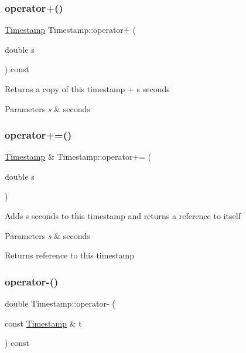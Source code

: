 \subsubsection{\texorpdfstring{operator+()}{operator+()}}
{\footnotesize\ttfamily \hyperlink{classDUtils_1_1Timestamp}{Timestamp} Timestamp\+::operator+ (\begin{DoxyParamCaption}\item[{double}]{s }\end{DoxyParamCaption}) const}

Returns a copy of this timestamp + s seconds 
\begin{DoxyParams}{Parameters}
{\em s} & seconds \\
\hline
\end{DoxyParams}
\mbox{\label{classDUtils_1_1Timestamp_a609bb289c3833fd6c26c9ee831074a11}} 
\subsubsection{\texorpdfstring{operator+=()}{operator+=()}}
{\footnotesize\ttfamily \hyperlink{classDUtils_1_1Timestamp}{Timestamp} \& Timestamp\+::operator+= (\begin{DoxyParamCaption}\item[{double}]{s }\end{DoxyParamCaption})}

Adds s seconds to this timestamp and returns a reference to itself 
\begin{DoxyParams}{Parameters}
{\em s} & seconds \\
\hline
\end{DoxyParams}
\begin{DoxyReturn}{Returns}
reference to this timestamp 
\end{DoxyReturn}
\mbox{\label{classDUtils_1_1Timestamp_ac7f07414867eaa6bea6acd7b41e9f60c}} 
\subsubsection{\texorpdfstring{operator-\/()}{operator-()}\hspace{0.1cm}{\footnotesize\ttfamily [1/2]}}
{\footnotesize\ttfamily double Timestamp\+::operator-\/ (\begin{DoxyParamCaption}\item[{const \hyperlink{classDUtils_1_1Timestamp}{Timestamp} \&}]{t }\end{DoxyParamCaption}) const}

